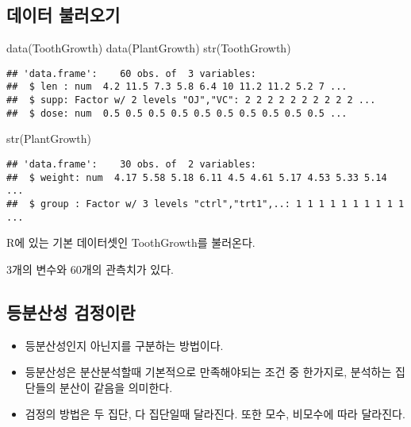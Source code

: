 \documentclass[
]{article}
\newenvironment{Shaded}{\begin{snugshade}}{\end{snugshade}}
\newcommand{\FunctionTok}[1]{\textcolor[rgb]{0.00,0.00,0.00}{#1}}
\newcommand{\NormalTok}[1]{#1}
\begin{document}
\hypertarget{uxb370uxc774uxd130-uxbd88uxb7ecuxc624uxae30-1}{%
\subsection{데이터 불러오기}\label{uxb370uxc774uxd130-uxbd88uxb7ecuxc624uxae30-1}}

\begin{Shaded}
\begin{Highlighting}[]
\FunctionTok{data}\NormalTok{(ToothGrowth)}
\FunctionTok{data}\NormalTok{(PlantGrowth)}
\FunctionTok{str}\NormalTok{(ToothGrowth)}
\end{Highlighting}
\end{Shaded}

\begin{verbatim}
## 'data.frame':    60 obs. of  3 variables:
##  $ len : num  4.2 11.5 7.3 5.8 6.4 10 11.2 11.2 5.2 7 ...
##  $ supp: Factor w/ 2 levels "OJ","VC": 2 2 2 2 2 2 2 2 2 2 ...
##  $ dose: num  0.5 0.5 0.5 0.5 0.5 0.5 0.5 0.5 0.5 0.5 ...
\end{verbatim}

\begin{Shaded}
\begin{Highlighting}[]
\FunctionTok{str}\NormalTok{(PlantGrowth)}
\end{Highlighting}
\end{Shaded}

\begin{verbatim}
## 'data.frame':    30 obs. of  2 variables:
##  $ weight: num  4.17 5.58 5.18 6.11 4.5 4.61 5.17 4.53 5.33 5.14 ...
##  $ group : Factor w/ 3 levels "ctrl","trt1",..: 1 1 1 1 1 1 1 1 1 1 ...
\end{verbatim}

R에 있는 기본 데이터셋인 ToothGrowth를 불러온다.

3개의 변수와 60개의 관측치가 있다.

\hypertarget{uxb4f1uxbd84uxc0b0uxc131-uxac80uxc815uxc774uxb780}{%
\subsection{등분산성 검정이란}\label{uxb4f1uxbd84uxc0b0uxc131-uxac80uxc815uxc774uxb780}}

\begin{itemize}
\item
  등분산성인지 아닌지를 구분하는 방법이다.
\item
  등분산성은 분산분석할때 기본적으로 만족해야되는 조건 중 한가지로, 분석하는 집단들의 분산이 같음을 의미한다.
\item
  검정의 방법은 두 집단, 다 집단일때 달라진다. 또한 모수, 비모수에 따라 달라진다.
\end{itemize}
\end{document}
